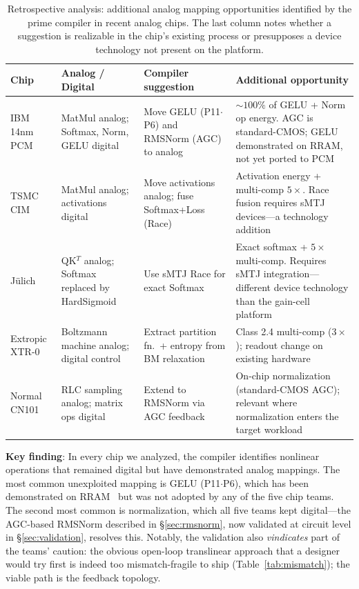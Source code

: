 \documentclass[11pt]{article}
\begin{document}
\begin{table}[t]
\centering
\caption{Retrospective analysis: additional analog mapping opportunities identified by the prime compiler in recent analog chips. The last column notes whether a suggestion is realizable in the chip's existing process or presupposes a device technology not present on the platform.}
\label{tab:chips}
\footnotesize
\begin{tabular}{p{2.8cm}p{2.5cm}p{2.5cm}p{4.5cm}}
\toprule
Chip & Analog / Digital & Compiler suggestion & Additional opportunity \\
\midrule
IBM 14nm PCM~\cite{ibm2025} & MatMul analog; Softmax, Norm, GELU digital & Move GELU (P11$\cdot$P6) and RMSNorm (AGC) to analog & ${\sim}100\%$ of GELU + Norm op energy. AGC is standard-CMOS; GELU demonstrated on RRAM, not yet ported to PCM \\
\midrule
TSMC CIM~\cite{tsmc2025} & MatMul analog; activations digital & Move activations analog; fuse Softmax+Loss (Race) & Activation energy + multi-comp $5\times$. Race fusion requires sMTJ devices---a technology addition \\
\midrule
J\"ulich~\cite{leroux2025a} & QK$^T$ analog; Softmax replaced by HardSigmoid & Use sMTJ Race for exact Softmax & Exact softmax + $5\times$ multi-comp. Requires sMTJ integration---different device technology than the gain-cell platform \\
\midrule
Extropic XTR-0~\cite{extropic2025} & Boltzmann machine analog; digital control & Extract partition fn.\ + entropy from BM relaxation & Class 2.4 multi-comp ($3\times$); readout change on existing hardware \\
\midrule
Normal CN101~\cite{normal2025} & RLC sampling analog; matrix ops digital & Extend to RMSNorm via AGC feedback & On-chip normalization (standard-CMOS AGC); relevant where normalization enters the target workload \\
\bottomrule
\end{tabular}
\end{table}

\textbf{Key finding}: In every chip we analyzed, the compiler identifies nonlinear operations that remained digital but have demonstrated analog mappings. The most common unexploited mapping is GELU (P11$\cdot$P6), which has been demonstrated on RRAM~\cite{rram_swish2022,raceit2023} but was not adopted by any of the five chip teams. The second most common is normalization, which all five teams kept digital---the AGC-based RMSNorm described in \S\ref{sec:rmsnorm}, now validated at circuit level in \S\ref{sec:validation}, resolves this. Notably, the validation also \textit{vindicates} part of the teams' caution: the obvious open-loop translinear approach that a designer would try first is indeed too mismatch-fragile to ship (Table~\ref{tab:mismatch}); the viable path is the feedback topology.
\end{document}

